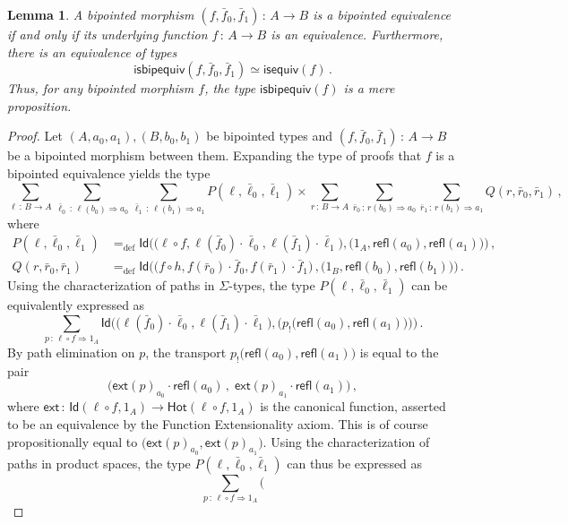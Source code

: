 \documentclass[10pt,a4paper,oneside,reqno]{amsart}
\theoremstyle{mythm}
\newtheorem{lemma}[theorem]{Lemma}
\theoremstyle{mydef}
\theoremstyle{myrmk}
\newcommand{\defeq}{=_{\mathrm{def}}}
\newcommand{\co}{\,{:}\,}
\newcommand{\com}{\circ}
\newcommand{\ct}{\cdot}
\newcommand{\isequiv}{\mathsf{isequiv}}
\newcommand{\Hot}{\mathsf{Hot}}
\newcommand{\ext}{\mathsf{ext}}
\newcommand{\Id}{\mathsf{Id}}
\newcommand{\refl}{\mathsf{refl}}
\newcommand{\isbipequiv}{\mathsf{isbipequiv}}
\begin{document}
\begin{lemma}\label{BoolAlgSpace}  \label{thm:usemere}
A bipointed morphism $(f, \bar{f}_0, \bar{f}_1) \co A \to B$ is a bipointed equivalence if and only
if its underlying function $f \co A \to B$ is an equivalence. Furthermore, there is an equivalence of types
\[
\isbipequiv(f, \bar{f}_0, \bar{f}_1)  \simeq \isequiv(f) \, .
\]
Thus, for any bipointed morphism $f$, the type $\isbipequiv(f)$ is a mere proposition.
\end{lemma}  

\begin{proof}
Let $(A,a_0,a_1), (B,b_0,b_1)$ be bipointed types and $(f, \bar{f}_0, \bar{f}_1) \co A \to B$ be a bipointed morphism between them. Expanding the type of 
proofs that $f$ is a bipointed equivalence yields the type
\[
 \sum_{\ell \co B \to  A}  
 \sum_{\bar{\ell}_0 \co \ell(b_0) \Rightarrow a_0} 
 \sum_{\bar{\ell}_1 \co \ell(b_1) \Rightarrow a_1} 
 P(\ell,\bar{\ell}_0,\bar{\ell}_1) \times 
 \sum_{r \co B \to A} 
 \sum_{\bar{r}_0 \co r(b_0) \Rightarrow a_0} 
 \sum_{\bar{r}_1 \co  r(b_1) \Rightarrow a_1} 
 Q(r,\bar{r}_0,\bar{r}_1)   \, ,
\]
where
\begin{align*}
P(\ell,\bar{\ell}_0,\bar{\ell}_1) & \defeq \Id \Big( \big( \ell \com f, \ell(\bar{f}_0) \ct \bar{\ell}_0, \ell(\bar{f}_1) \ct \bar{\ell}_1\big), \big( 1_A, \refl(a_0), \refl(a_1) \big) \Big)  \, , \\
Q(r,\bar{r}_0,\bar{r}_1) & \defeq \Id \Big( \big( f \com h,   f(\bar{r}_0) \ct \bar{f}_0, f(\bar{r}_1) \ct \bar{f}_1  \big) \, , \big( 1_B, \refl(b_0), \refl(b_1) \big) \Big) \, .
\end{align*}
Using the characterization of paths in $\Sigma$-types, the type $P(\ell,\bar{\ell}_0,\bar{\ell}_1)$ can be equivalently expressed as
\[
\sum_{p \co \ell \com f \Rightarrow 1_A}  
\Id \Big(  \big( \ell (\bar{f}_0) \ct \bar{\ell }_0, \ell (\bar{f}_1) \ct \bar{\ell }_1\big), \big( p_{!}\big(\refl(a_0), \refl(a_1) \big) \big) \Big) \, .
\]
By path elimination on $p$, the transport $p_{!}\big(\refl(a_0), \refl(a_1) \big)$ is equal to the pair 
\[
\big(  \ext(p)_{a_0} \ct \refl(a_0) \, , \;  \ext(p)_{a_1} \ct \refl(a_1) \big) \, ,
\]
where $\ext \co \Id(\ell \com f, 1_A) \to \Hot(\ell \com f,  1_A)$ is the canonical function, asserted to be an equivalence by the Function Extensionality axiom. This is of course propositionally equal to $\big(\ext(p)_{a_0}, \ext(p)_{a_1} \big)$. Using the characterization of paths in product spaces, the type $P(\ell,\bar{\ell}_0,\bar{\ell}_1)$ can thus be expressed as
\[
\sum_{ p \co \ell \com f \Rightarrow 1_A} \Big(
\]
\end{proof}
\end{document}
